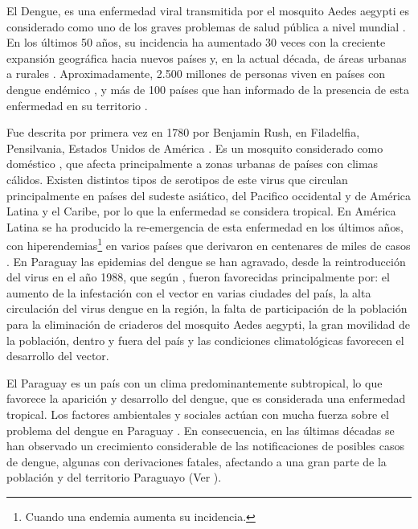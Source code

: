 
El Dengue, es una enfermedad viral transmitida por el mosquito Aedes aegypti es considerado como
uno de los graves problemas de salud pública a nivel mundial
\citep{dengueUruguayCap1, world2009dengue, DIBO2005}. En los últimos 50 años, su incidencia ha
aumentado 30 veces con la creciente expansión geográfica hacia nuevos países y, en la actual
década, de áreas urbanas a rurales \cite{world2009dengue}. Aproximadamente, 2.500 millones de
personas viven en países con dengue endémico \cite{world2009dengue, gustavo2006dengue}, y más de
100 países que han informado de la presencia de esta enfermedad en su territorio
\cite{gustavo2006dengue}.

Fue descrita por primera vez en 1780 por Benjamin Rush, en Filadelfia, Pensilvania, Estados Unidos
de América \citep{gustavo2006dengue}. Es un mosquito considerado como doméstico
\cite{luevano1993ciclo}, que afecta principalmente a zonas urbanas de países con climas cálidos.
Existen distintos tipos de serotipos de este virus que circulan principalmente en países del
sudeste asiático, del Pacifico occidental y de América Latina y el Caribe, por lo que la
enfermedad se considera tropical\citep{gustavo2006dengue}. En América Latina se ha producido la
re-emergencia de esta enfermedad en los últimos años, con hiperendemias\footnote{ Cuando una
endemia aumenta su incidencia.} en varios países que derivaron en centenares de miles de casos
\cite{dengueUruguayCap1}. En Paraguay las epidemias del dengue se han agravado, desde la
reintroducción del virus en el año 1988, que según \cite{planControlMspbs2014}, fueron favorecidas
principalmente por: el aumento de la infestación con el vector en varias ciudades del país, la
alta circulación del virus dengue en la región, la falta de participación de la población para la
eliminación de criaderos del mosquito Aedes aegypti, la gran movilidad de la población, dentro y
fuera del país y las condiciones climatológicas favorecen el desarrollo del vector.

El Paraguay es un país con un clima predominantemente subtropical, lo que favorece la aparición y
desarrollo del dengue, que es considerada una enfermedad tropical\cite{gustavo2006dengue,DIBO2005}.
Los factores ambientales y sociales actúan con mucha fuerza sobre el problema del dengue en
Paraguay \cite{website:mspbsHistoria2014}. En consecuencia, en las últimas décadas se han
observado un crecimiento considerable de las notificaciones de posibles casos de dengue, algunas
con derivaciones fatales, afectando a una gran parte de la población y del territorio Paraguayo
(Ver ).

